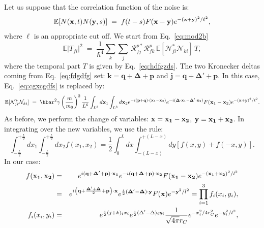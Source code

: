 \documentclass[12pt,onecolumn,amssymb,nofootinbib]{revtex4-2} %
\begin{document}
Let us suppose that the correlation function of the noise is:
\begin{equation} \label{eq:sdfddas1}
{\mathbb E}[N(\mathbf{x},t) N(\mathbf{y},s)] \; = \;
f(t-s)F({\bf x} - {\bf y}) e^{-({\bf x} + {\bf y})^2/\ell^2},
\end{equation}
where $\ell$ is an appropriate cut off. We start from Eq.~\eqref{eq:mod2b}
\begin{equation} \label{eq:mod3n}
\mathbb{E}|T_{fi}|^{2} \; = \;
\frac{1}{\hbar^{4}}\underset{k}{\sum}\underset{j}{\sum}\, {\mathcal R}_{fj}^{p*} {\mathcal R}_{fk}^{p}\, {\mathbb E}[{\mathcal N}_{ji}^{*} {\mathcal N}_{ki}]
\,T,
\end{equation}
where the temporal part $T$ is given by Eq.~\eqref{eq:hdfgzds}. The two Kronecker deltas coming from Eq.~\eqref{eq:fdgdfg} set: $\mathbf{k=q+\Delta+p}$ and $\mathbf{j=q+\Delta'+p}$. In this case, Eq.~\eqref{eq:cgxcgdfs} is replaced by:
\begin{equation}
{\mathbb E}[{\mathcal N}_{ji}^{*} {\mathcal N}_{ki}] \; = \; \hbar^2 \gamma \left( \frac{m}{m_0} \right)^2 \frac{1}{L^6} \int_{L^3} d {\bf x}_1 \int_{L^3} d {\bf x}_2 e^{-i({\bf p+q})\cdot ({\bf x}_1 - {\bf x}_2)} e^{-i ({\bf \Delta}\cdot {\bf x}_1 - {\bf \Delta}'\cdot {\bf x}_2)} F({\bf x}_1 - {\bf x}_2) e^{-({\bf x} + {\bf y})^2/\ell^2}.
\end{equation}
As before, we perform the change of variables: $\bf{x} = {\bf x}_{1} - {\bf x}_{2}$, $\bf{y} = {\bf x}_{1} + {\bf x}_{2}$. In integrating over the new variables, we use the rule:
\begin{equation}
\int_{-\frac{L}{2}}^{+\frac{L}{2}}dx_{1}\int_{-\frac{L}{2}}^{+\frac{L}{2}}dx_{2}f\left(x_{1},x_{2}\right)
=\frac{1}{2}\int_{0}^{L}dx\int_{-\left(L-x\right)}^{+\left(L-x\right)}dy
\left[f\left(x,y\right)+f\left(-x,y\right)\right].
\end{equation}
In our case:
\begin{eqnarray}
f(\mathbf{x_{1},x_{2}}) & = & e^{i\mathbf{(q+\Delta'+p)\cdot x_{1}}}e^{-i\mathbf{(q+\Delta+p)\cdot x_{2}}}F(\mathbf{x_{1}-x_{2}})e^{-(\mathbf{x_{1}+x_{2}})^{2}/l^{2}} \\
& = & e^{i\left({\bf q}+\frac{{\bf \Delta}'+{\bf \Delta}}{2}+ {\bf p}\right)\cdot\mathbf{x}}e^{\frac{i}{2}\mathbf{(\Delta'-\Delta)\cdot\mathbf{y}}}F(\mathbf{x})
e^{-\mathbf{y}^{2}/l^{2}}=\prod_{i=1}^3 f_i(x_i,y_i),\\
f_i(x_i,y_i)& =
&e^{\frac{i}{2}(j+k)_ix_i}e^{\frac{i}{2}(\Delta'-\Delta)_i
y_i}\frac{1}{\sqrt{4\pi}r_C} e^{-x_i^2/4r_C^2}e^{-y_i^2/l^2},
\end{eqnarray}
\end{document}
